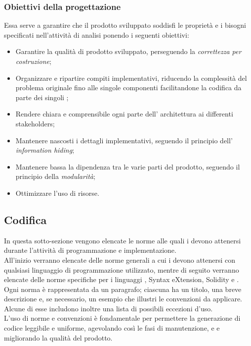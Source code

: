\documentclass[NormeDiProgetto.tex]{subfiles}
\begin{document}
\subsubsection{Obiettivi della progettazione}
Essa serve a garantire che il prodotto sviluppato soddisfi le proprietà e i bisogni specificati nell'attività di analisi ponendo i seguenti obiettivi:
\begin{itemize}
	\item Garantire la qualità di prodotto sviluppato, perseguendo la \textit{correttezza
		per costruzione};
	\item Organizzare e ripartire compiti implementativi, riducendo la
	complessità del problema originale fino alle singole componenti
	facilitandone la codifica da parte dei singoli \progri;
	\item Rendere chiara e comprensibile ogni parte dell' architettura ai differenti stakeholders;
	\item Mantenere nascosti i dettagli implementativi, seguendo il principio dell' \textit{information hiding};
	\item Mantenere bassa la dipendenza tra le varie parti del prodotto, seguendo il principio della \textit{modularità};
	\item Ottimizzare l’uso di risorse.
\end{itemize}

\subsection{Codifica}
In questa sotto-sezione vengono elencate le norme alle quali i \progri devono attenersi durante l'attività di programmazione e implementazione.\\
All'inizio verranno elencate delle norme generali a cui i \progri devono attenersi con qualsiasi linguaggio di programmazione utilizzato, mentre di seguito verranno elencate delle norme specifiche per i linguaggi ,  Syntax eXtension, Solidity e .\\
Ogni norma è rappresentata da un paragrafo; ciascuna ha un titolo, una breve descrizione e, se necessario, un esempio che illustri le convenzioni da applicare. Alcune di esse includono inoltre una lista di possibili eccezioni d'uso.\\
L'uso di norme e convenzioni è fondamentale per permettere la generazione di codice leggibile e uniforme, agevolando così le fasi di manutenzione,  e  e migliorando la qualità del prodotto.
\end{document}

